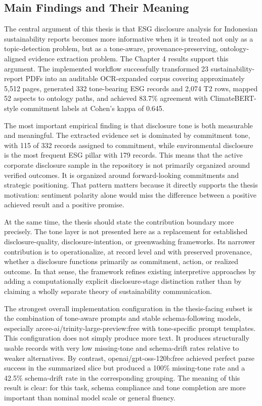 \subsection{Main Findings and Their Meaning}

The central argument of this thesis is that ESG disclosure analysis for Indonesian sustainability reports becomes more informative when it is treated not only as a topic-detection problem, but as a tone-aware, provenance-preserving, ontology-aligned evidence extraction problem. The Chapter 4 results support this argument. The implemented workflow successfully transformed 23 sustainability-report PDFs into an auditable OCR-expanded corpus covering approximately 5,512 pages, generated 332 tone-bearing ESG records and 2,074 T2 rows, mapped 52 aspects to ontology paths, and achieved 83.7\% agreement with ClimateBERT-style commitment labels at Cohen’s kappa of 0.645.

The most important empirical finding is that disclosure tone is both measurable and meaningful. The extracted evidence set is dominated by commitment tone, with 115 of 332 records assigned to commitment, while environmental disclosure is the most frequent ESG pillar with 179 records. This means that the active corporate disclosure sample in the repository is not primarily organized around verified outcomes. It is organized around forward-looking commitments and strategic positioning. That pattern matters because it directly supports the thesis motivation: sentiment polarity alone would miss the difference between a positive achieved result and a positive promise.

At the same time, the thesis should state the contribution boundary more precisely. The tone layer is not presented here as a replacement for established disclosure-quality, disclosure-intention, or greenwashing frameworks. Its narrower contribution is to operationalize, at record level and with preserved provenance, whether a disclosure functions primarily as commitment, action, or realized outcome. In that sense, the framework refines existing interpretive approaches by adding a computationally explicit disclosure-stage distinction rather than by claiming a wholly separate theory of sustainability communication.

The strongest overall implementation configuration in the thesis-facing subset is the combination of tone-aware prompts and stable schema-following models, especially arcee-ai/trinity-large-preview:free with tone-specific prompt templates. This configuration does not simply produce more text. It produces structurally usable records with very low missing-tone and schema-drift rates relative to weaker alternatives. By contrast, openai/gpt-oss-120b:free achieved perfect parse success in the summarized slice but produced a 100\% missing-tone rate and a 42.5\% schema-drift rate in the corresponding grouping. The meaning of this result is clear: for this task, schema compliance and tone completion are more important than nominal model scale or general fluency.

